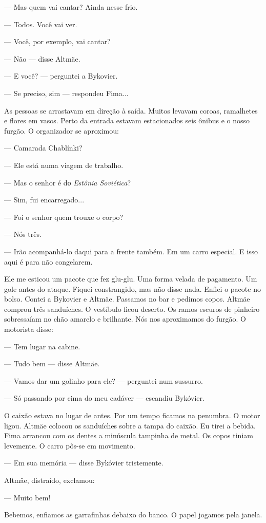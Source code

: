 --- Mas quem vai cantar? Ainda nesse frio.

--- Todos. Você vai ver.

--- Você, por exemplo, vai cantar?

--- Não --- disse Altmäe.

--- E você? --- perguntei a Bykovier.

--- Se preciso, sim --- respondeu Fima...

As pessoas se arrastavam em direção à saída. Muitos levavam coroas,
ramalhetes e flores em vasos. Perto da entrada estavam estacionados seis
ônibus e o nosso furgão. O organizador se aproximou:

--- Camarada Chablínki?

--- Ele está numa viagem de trabalho.

--- Mas o senhor é dо \emph{Estônia Soviética}?

--- Sim, fui encarregado...

--- Foi o senhor quem trouxe o corpo?

--- Nós três.

--- Irão acompanhá-lo daqui para a frente também. Em um carro especial.
E isso aqui é para não congelarem.

Ele me esticou um pacote que fez glu-glu. Uma forma velada de pagamento.
Um gole antes do ataque. Fiquei constrangido, mas não disse nada. Enfiei
o pacote no bolso. Contei a Bykovier e Altmäe. Passamos no bar e pedimos
copos. Altmäe comprou três sanduíches. O vestíbulo ficou deserto. Os
ramos escuros de pinheiro sobressaíam no chão amarelo e brilhante. Nós
nos aproximamos do furgão. O motorista disse:

--- Tem lugar na cabine.

--- Tudo bem --- disse Altmäe.

--- Vamos dar um golinho para ele? --- perguntei num sussurro.

--- Só passando por cima do meu cadáver --- escandiu Bykóvier.

O caixão estava no lugar de antes. Por um tempo ficamos na penumbra. O
motor ligou. Altmäe colocou os sanduíches sobre a tampa do caixão. Eu
tirei a bebida. Fima arrancou com os dentes a minúscula tampinha de
metal. Os copos tiniam levemente. O carro pôs-se em movimento.

--- Em sua memória --- disse Bykóvier tristemente.

Altmäe, distraído, exclamou:

--- Muito bem!

Bebemos, enfiamos as garrafinhas debaixo do banco. O papel jogamos pela
janela.


